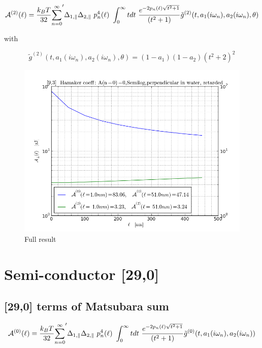 \documentclass[a4paper]{article}
\begin{document}
\begin{center}
\begin{equation}
{\cal A}^{(2)}(\ell) = \frac{k_BT}{32}  {\sum_{n=0}^{\infty}}' \Delta_{1,\parallel} \Delta_{2,\parallel} ~p_n^{4}(\ell) ~\int_0^{\infty} t dt ~\frac{e^{- 2 p_n(\ell) \sqrt{t^{2} + 1}}}{(t^{2} + 1)} \tilde g^{(2)}(t, a_1(i \omega_n), a_2(i \omega_n), \theta)
\end{equation}

with

\begin{equation}
\tilde g^{(2)}(t, a_1(i \omega_n), a_2(i \omega_n), \theta) = (1-a_1)(1-a_2)(t^{2} + 2)^2
\label{befgqw}
\end{equation}

\begin{figure}[t!]
\begin{center}
\includegraphics[width=1.0\textwidth]{plots/140322_93w93_HCs_n0_semilog_perpendicular_ret.png}
\hskip 43pt
\caption{Full result}
\label{eiz65}
\end{center}
\end{figure} 

\section{Semi-conductor [29,0]}
\subsection{[29,0] terms of Matsubara sum}
\begin{equation}
{\cal A}^{(0)}(\ell) = \frac{k_BT}{32}  {\sum_{n=0}^{\infty}}' \Delta_{1,\parallel} \Delta_{2,\parallel} ~p_n^{4}(\ell) ~\int_0^{\infty} t dt ~\frac{e^{- 2 p_n(\ell) \sqrt{t^{2} + 1}}}{(t^{2} + 1)} \tilde g^{(0)}(t, a_1(i \omega_n), a_2(i \omega_n))
\end{equation}


\end{center}
\end{document}
